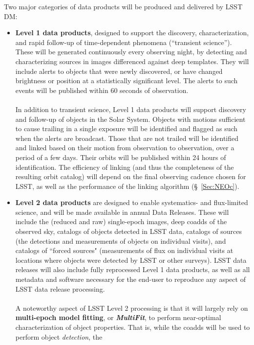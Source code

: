 \documentclass{emulateapj}
\begin{document}
Two major categories of data products will be produced and delivered by LSST DM:
\begin{itemize}
\item {\bf Level 1 data products}, designed to support the discovery,
  characterization, and rapid follow-up of time-dependent phenomena
  (``transient science''). These will be generated continuously every
  observing night, by detecting and characterizing sources in images
  differenced against deep templates. They will include alerts to
  objects that were newly discovered, or have changed brightness or
  position at a statistically significant level. The alerts to such
  events will be published within 60   seconds of observation.\\ 
\\
In addition to transient science, Level 1 data products will support
discovery and follow-up of objects in the Solar System. Objects with
motions sufficient to cause trailing in a single exposure will be
identified and flagged as such when the alerts are broadcast. Those
that are not trailed will be identified and linked based on their
motion from observation to observation, over a period of a few
days. Their orbits will be published within 24 hours of
identification. The efficiency of linking (and thus the completeness
of the resulting orbit catalog) will depend on the final observing
cadence chosen for LSST, as well as the performance of the linking
algorithm (\S~\ref{Sec:NEOc}).
\item {\bf Level 2 data products} are designed to enable systematics- and flux-limited science, and will be made available in annual Data Releases. These will include the (reduced and raw) single-epoch images, deep coadds of the observed sky, catalogs of objects detected in LSST data, catalogs of sources (the detections and measurements of objects on individual visits), and catalogs of ``forced sources" (measurements of flux on individual visits at locations where objects were detected by LSST or other surveys). LSST data releases will also include fully reprocessed Level 1 data products, as well as all metadata and software necessary for the end-user to reproduce any aspect of LSST data release processing.\\
\\
A noteworthy aspect of LSST Level 2 processing is that it will largely
rely on {\bf multi-epoch model fitting}, or {\bf \em MultiFit}, to
perform near-optimal characterization of object properties. That is,
while the coadds will be used to perform object {\em detection}, the

\end{itemize}
\end{document}
